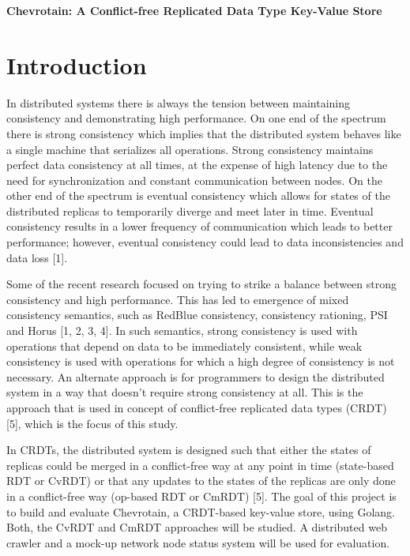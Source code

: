 \documentclass[11pt]{article}
\title{\textbf{{\vspace{-10ex}}}}
\author{\vspace{-10ex}}
\date{\vspace{-10ex}}
\begin{document}
\abovedisplayskip=5pt
\belowdisplayskip=5pt

\begin{center}
{\Large\textbf{Chevrotain: A Conflict-free Replicated Data Type Key-Value Store}}
\end{center}

\section{Introduction}
In distributed systems there is always the tension between maintaining consistency and demonstrating high performance. On one end of the spectrum there is strong consistency which implies that the distributed system behaves like a single machine that serializes all operations. Strong consistency maintains perfect data consistency at all times, at the expense of high latency due to the need for synchronization and constant communication between nodes. On the other end of the spectrum is eventual consistency which allows for states of the distributed replicas to temporarily diverge and meet later in time. Eventual consistency results in a lower frequency of communication which leads to better performance; however, eventual consistency could lead to data inconsistencies and data loss [1].

Some of the recent research focused on trying to strike a balance between strong consistency and high performance. This has led to emergence of mixed consistency semantics, such as RedBlue consistency, consistency rationing, PSI and Horus [1, 2, 3, 4]. In such semantics, strong consistency is used with operations that depend on data to be immediately consistent, while weak consistency is used with operations for which a high degree of consistency is not necessary. An alternate approach is for programmers to design the distributed system in a way that doesn’t require strong consistency at all. This is the approach that is used in concept of conflict-free replicated data types (CRDT) [5], which is the focus of this study.

In CRDTs, the distributed system is designed such that either the states of replicas could be merged in a conflict-free way at any point in time (state-based RDT or CvRDT) or that any updates to the states of the replicas are only done in a conflict-free way (op-based RDT or CmRDT) [5]. The goal of this project is to build and evaluate Chevrotain, a CRDT-based key-value store, using Golang. Both, the CvRDT and CmRDT approaches will be studied. A distributed web crawler and a mock-up network node status system will be used for evaluation.
\end{document}
